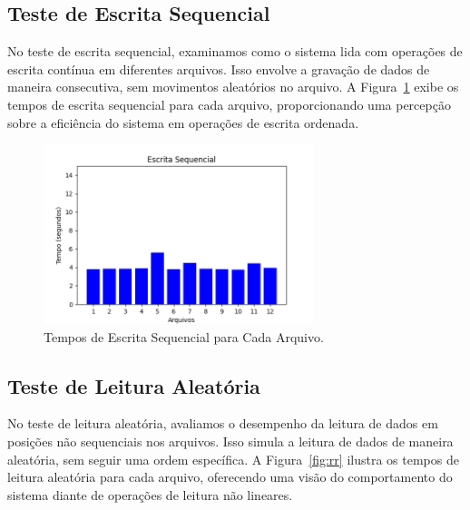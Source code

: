 \documentclass[
	12pt,				%
	openright,			%
	oneside,			%
	a4paper,			%
	chapter=TITLE,		%
	english,			%
	french,				%
	spanish,			%
	brazil				%
	]{abntex2}
\theoremstyle{definition}
\begin{document}

\subsection{Teste de Escrita Sequencial}

No teste de escrita sequencial, examinamos como o sistema lida com operações 
de escrita contínua em diferentes arquivos. Isso envolve a gravação de dados 
de maneira consecutiva, sem movimentos aleatórios no arquivo. 
A Figura~\ref{fig:sw} exibe os tempos de escrita sequencial para cada 
arquivo, proporcionando uma percepção sobre a eficiência do sistema em 
operações de escrita ordenada.

\begin{figure}[H]
    \centering
    \includegraphics[width=0.7\textwidth]{SeqWrite.png}
    \caption{Tempos de Escrita Sequencial para Cada Arquivo.}
    \label{fig:sw}
\end{figure}


\subsection{Teste de Leitura Aleatória}

No teste de leitura aleatória, avaliamos o desempenho da leitura de dados 
em posições não sequenciais nos arquivos. Isso simula a leitura de dados 
de maneira aleatória, sem seguir uma ordem específica. A Figura~\ref{fig:rr} 
ilustra os tempos de leitura aleatória para cada arquivo, oferecendo uma 
visão do comportamento do sistema diante de operações de leitura não lineares.
\end{document}
